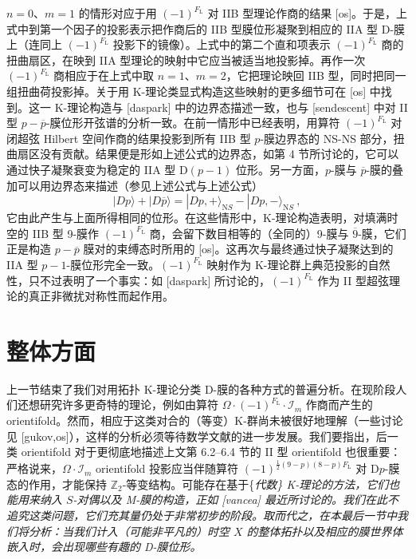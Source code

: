 \documentclass[11pt,a4paper]{ctexart}
\newcommand{\SrcRange}[2]{\marginpar{\raggedright\footnotesize 原文 p.#1}}
\begin{document}
\(n=0\)、\(m=1\) 的情形对应于用 \({(-1)^{F_{\mathrm L}}}\) 对 IIB 型理论作商的结果 [os]。于是，上式中到第一个因子的投影表示把作商后的 IIB 型膜位形凝聚到相应的 IIA 型 D-膜上（连同上 \({(-1)^{F_{\mathrm L}}}\) 投影下的镜像）。上式中的第二个直和项表示 \({(-1)^{F_{\mathrm L}}}\) 商的扭曲扇区，在映到 IIA 型理论的映射中它应当被适当地投影掉。再作一次 \({(-1)^{F_{\mathrm L}}}\) 商相应于在上式中取 \(n=1\)、\(m=2\)，它把理论映回 IIB 型，同时把同一组扭曲荷投影掉。关于用 K-理论类显式构造这些映射的更多细节可在 [os] 中找到。这一 K-理论构造与 [daspark] 中的边界态描述一致，也与 [sendescent] 中对 II 型 \(p-\overline{p}\)-膜位形开弦谱的分析一致。在前一情形中已经表明，用算符 \({(-1)^{F_{\mathrm L}}}\) 对闭超弦 Hilbert 空间作商的结果投影到所有 IIB 型 \(p\)-膜边界态的 NS-NS 部分，扭曲扇区没有贡献。结果便是形如上述公式的边界态，如第 4 节所讨论的，它可以通过快子凝聚衰变为稳定的 IIA 型 D\((p-1)\) 位形。另一方面，\(p\)-膜与 \(\overline{p}\)-膜的叠加可以用边界态来描述（参见上述公式与上述公式） \[|Dp\rangle+|D\overline{p}\rangle=|Dp,+\rangle_{{\mathrm NS}}-
|Dp,-\rangle_{{\mathrm NS}}\ ,\] 它由此产生与上面所得相同的位形。在这些情形中，K-理论构造表明，对填满时空的 IIB 型 9-膜作 \({(-1)^{F_{\mathrm L}}}\) 商，会留下数目相等的（全同的）9-膜与 \(\overline{9}\)-膜，它们正是构造 \(p-\overline{p}\) 膜对的束缚态时所用的 [os]。这再次与最终通过快子凝聚达到的 IIA 型 \(p-1\)-膜位形完全一致。\({(-1)^{F_{\mathrm L}}}\) 映射作为 K-理论群上典范投影的自然性，只不过表明了一个事实：如 [daspark] 所讨论的，\({(-1)^{F_{\mathrm L}}}\) 作为 II 型超弦理论的真正非微扰对称性而起作用。

\SrcRange{84}{84}
\section{整体方面}\label{ux6574ux4f53ux65b9ux9762}

上一节结束了我们对用拓扑 K-理论分类 D-膜的各种方式的普遍分析。在现阶段人们还想研究许多更奇特的理论，例如由算符 \(\Omega\cdot{(-1)^{F_{\mathrm L}}}\cdot{\mathcal I}_m\) 作商而产生的 orientifold。然而，相应于这类对合的（等变）K-群尚未被很好地理解（一些讨论见 [gukov,os]），这样的分析必须等待数学文献的进一步发展。我们要指出，后一类 orientifold 对于更彻底地描述上文第 6.2--6.4 节的 II 型 orientifold 也很重要：严格说来，\(\Omega\cdot{\mathcal I}_m\) orientifold 投影应当伴随算符 \((-1)^{\frac{1}{2}(9-p)(8-p)F_{\mathrm L}}\) 对 D\(p\)-膜态的作用，才能保持 \({\mathbb{Z}}_2\)-等变结构。可能存在基于\{\it 代数\} K-理论的方法，它们也能用来纳入 \(S\)-对偶以及 M-膜的构造，正如 [vancea] 最近所讨论的。我们在此不追究这类问题，它们充其量仍处于非常初步的阶段。取而代之，在本最后一节中我们将分析：当我们计入（可能非平凡的）时空 \(X\) 的整体拓扑以及相应的膜世界体嵌入时，会出现哪些有趣的 D-膜位形。
\end{document}
